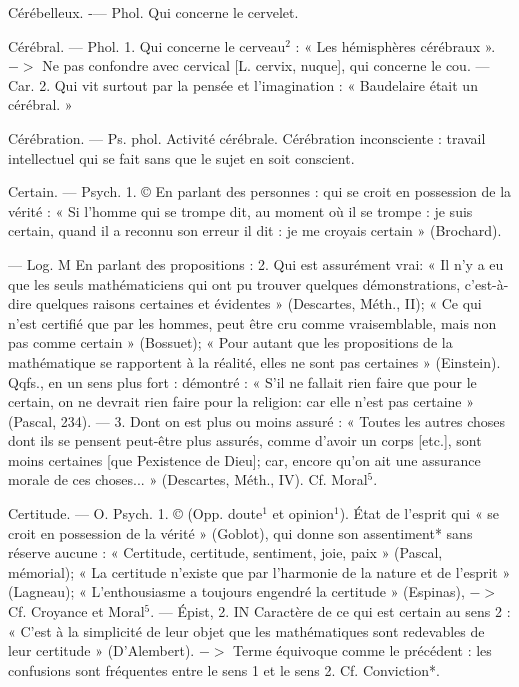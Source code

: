 Cérébelleux. -— Phol. Qui concerne
le cervelet.

Cérébral. — Phol. 1. Qui concerne le
cerveau$^2$ : « Les hémisphères cérébraux ». $->$ Ne pas confondre avec
cervical [L. cervix, nuque], qui concerne le cou. — Car. 2. Qui vit surtout par la pensée et l'imagination :
« Baudelaire était un cérébral. »

Cérébration. — Ps. phol. Activité
cérébrale. Cérébration inconsciente :
travail intellectuel qui se fait sans
que le sujet en soit conscient.

Certain. — Psych. 1. © En parlant des
personnes : qui se croit en possession de la vérité : « Si l'homme qui se
trompe dit, au moment où il se
trompe : je suis certain, quand il a
reconnu son erreur il dit : je me
croyais certain » (Brochard).

— Log. M En parlant des propositions : 2. Qui est assurément vrai:
« Il n’y a eu que les seuls mathématiciens qui ont pu trouver quelques
démonstrations, c’est-à-dire quelques
raisons certaines et évidentes »
(Descartes, Méth., II); « Ce qui n’est
certifié que par les hommes, peut
être cru comme vraisemblable, mais
non pas comme certain » (Bossuet);
« Pour autant que les propositions
de la mathématique se rapportent
à la réalité, elles ne sont pas certaines » (Einstein). Qqfs., en un sens
plus fort : démontré : « S’il ne fallait
rien faire que pour le certain, on ne
devrait rien faire pour la religion:
car elle n’est pas certaine » (Pascal,
234). — 3. Dont on est plus ou
moins assuré : « Toutes les autres
choses dont ils se pensent peut-être
plus assurés, comme d'avoir un
corps [etc.], sont moins certaines
[que Pexistence de Dieu]; car, encore
qu’on ait une assurance morale de
ces choses... » (Descartes, Méth., IV).
Cf. Moral$^5$.

Certitude. — O. Psych. 1. © (Opp.
doute$^1$ et opinion$^1$). État de l’esprit
qui « se croit en possession de la
vérité » (Goblot), qui donne son
assentiment* sans réserve aucune :
« Certitude, certitude, sentiment,
joie, paix » (Pascal, mémorial); « La
certitude n'existe que par l’harmonie de la nature et de l'esprit »
(Lagneau); « L’enthousiasme a toujours engendré la certitude » (Espinas), $->$ Cf. Croyance et Moral$^5$.
— Épist, 2. IN Caractère de ce qui
est certain au sens 2 : « C’est à la
simplicité de leur objet que les mathématiques sont redevables de leur
certitude » (D'Alembert). $->$ Terme
équivoque comme le précédent : les
confusions sont fréquentes entre le
sens 1 et le sens 2. Cf. Conviction*.

